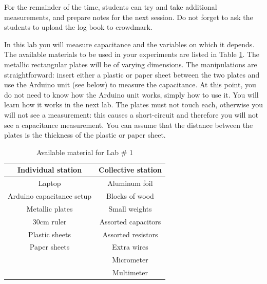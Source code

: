 \documentclass[12pt]{report}
\begin{document}
\begin{tcolorbox}
For the remainder of the time, students can try and take additional measurements, and prepare notes for the next session. Do not forget to ask the students to upload the log book to crowdmark.
\end{tcolorbox}

In this lab you will measure capacitance and the variables on which it depends. The available materials to be used in your experiments are listed in Table \ref{Tab:Lab1-material}. The metallic rectangular plates will be of varying dimensions. The manipulations are straightforward: insert either a plastic or paper sheet between the two plates and use the Arduino unit (see below) to measure the capacitance. At this point, you do not need to know how the Arduino unit works, simply how to use it. You will learn how it works in the next lab. The plates must not touch each, otherwise you will not see a measurement: this causes a short-circuit and therefore you will not see a capacitance measurement. You can assume that the distance between the plates is the thickness of the plastic or paper sheet.
\begin{table}[h]
\centering
\begin{tabular}{||c | c ||}
\hline
Individual station & Collective station\\ \hline
Laptop & Aluminum foil \\
Arduino capacitance setup & Blocks of wood \\
Metallic plates & Small weights \\
30cm ruler & Assorted capacitors \\
Plastic sheets & Assorted resistors \\
Paper sheets & Extra wires \\
& Micrometer \\
& Multimeter \\
\hline
\end{tabular}
\caption{Available material for Lab \# 1}
\label{Tab:Lab1-material}
\end{table}
\end{document}
